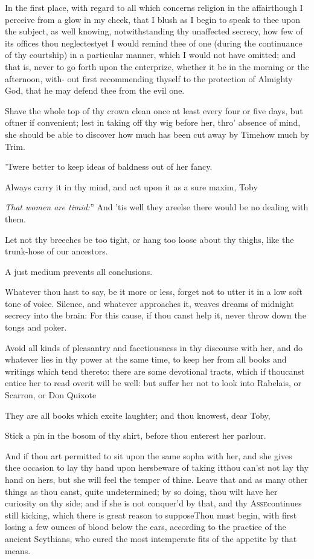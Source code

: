 \documentclass{article}
\begin{document}
In the first place, with regard to all which concerns religion
in the affair\tsh\break though I perceive from a glow in my
cheek, that I blush as I begin to speak to thee upon the subject,
as well knowing, notwithstanding thy unaffected secrecy, how few of
its offices thou neglectest\tsk yet I would remind thee of one
(during the continuance of thy courtship) in a particular manner,
which I would not have omitted; and that is, never to go forth upon
the enterprize, whether it be in the morning or the afternoon,
with-\pb
out first recommending thyself to the protection of Almighty
God, that he may defend thee from the evil one.

Shave the whole top of thy crown clean once at least every four
or five days, but oftner if convenient; lest in taking off thy wig
before her, thro’ absence of mind, she should be able to
discover how much has been cut away by Time\tsh how much
by Trim.

\tsh ’Twere better to keep ideas of baldness out of her
fancy.

Always carry it in thy mind, and act upon it as a sure maxim,
Toby\tsh

\lqq\textit{That women are timid:}” And ’tis well they
are\tsh else there would be no dealing with them.

\newpage
Let not thy breeches be too tight, or hang too loose about thy
thighs, like the trunk-hose of our ancestors.

\tsh A just medium prevents all conclusions.

Whatever thou hast to say, be it more or less, forget not to
utter it in a low soft tone of voice. Silence, and whatever
approaches it, weaves dreams of midnight secrecy into the brain:
For this cause, if thou canst help it, never throw down the
tongs and poker.

Avoid all kinds of pleasantry and facetiousness in thy discourse
with her, and do whatever lies in thy power at the same time, to
keep her from all books and writings which tend thereto: there are
some devotional tracts, which if thou\pb canst entice her to read
over\tsk it will be well: but suffer her not to look into
Rabelais, or Scarron, or Don Quixote\tsh

\tsh They are all books which excite laughter; and thou
knowest, dear Toby, 

Stick a pin in the bosom of thy shirt, before thou enterest her
parlour.

And if thou art permitted to sit upon the same sopha with her,
and she gives thee occasion to lay thy hand upon hers\tsk beware
of taking it\tsh thou can’st not lay thy hand on hers, but she
will feel the temper of thine. Leave that and as many other
things as thou canst, quite undetermined; by so doing, thou wilt
have her curiosity on thy side; and if she is not conquer’d by
that, and thy \textsc{Asse}\pb continues still kicking, which
there is great reason to suppose\tsh Thou must begin, with first
losing a few ounces of blood below the ears, according to the
practice of the ancient Scythians, who cured the most
intemperate fits of the appetite by that means.
\end{document}
